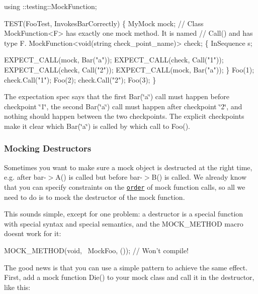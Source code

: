 \begin{DoxyCode}
using ::testing::MockFunction;

TEST(FooTest, InvokesBarCorrectly) \{
  MyMock mock;
  \textcolor{comment}{// Class MockFunction<F> has exactly one mock method.  It is named}
  \textcolor{comment}{// Call() and has type F.}
  MockFunction<void(string check\_point\_name)> check;
  \{
    InSequence s;

    EXPECT\_CALL(mock, Bar(\textcolor{stringliteral}{"a"}));
    EXPECT\_CALL(check, Call(\textcolor{stringliteral}{"1"}));
    EXPECT\_CALL(check, Call(\textcolor{stringliteral}{"2"}));
    EXPECT\_CALL(mock, Bar(\textcolor{stringliteral}{"a"}));
  \}
  Foo(1);
  check.Call(\textcolor{stringliteral}{"1"});
  Foo(2);
  check.Call(\textcolor{stringliteral}{"2"});
  Foo(3);
\}
\end{DoxyCode}


The expectation spec says that the first {\ttfamily Bar(\char`\"{}a\char`\"{})} call must happen before checkpoint \char`\"{}1\char`\"{}, the second {\ttfamily Bar(\char`\"{}a\char`\"{})} call must happen after checkpoint \char`\"{}2\char`\"{}, and nothing should happen between the two checkpoints. The explicit checkpoints make it clear which {\ttfamily Bar(\char`\"{}a\char`\"{})} is called by which call to {\ttfamily Foo()}.

\subsubsection*{Mocking Destructors}

Sometimes you want to make sure a mock object is destructed at the right time, e.\+g. after {\ttfamily bar-\/$>$A()} is called but before {\ttfamily bar-\/$>$B()} is called. We already know that you can specify constraints on the \href{#OrderedCalls}{\tt order} of mock function calls, so all we need to do is to mock the destructor of the mock function.

This sounds simple, except for one problem\+: a destructor is a special function with special syntax and special semantics, and the {\ttfamily M\+O\+C\+K\+\_\+\+M\+E\+T\+H\+OD} macro doesn\textquotesingle{}t work for it\+:


\begin{DoxyCode}
MOCK\_METHOD(\textcolor{keywordtype}{void}, ~MockFoo, ());  \textcolor{comment}{// Won't compile!}
\end{DoxyCode}


The good news is that you can use a simple pattern to achieve the same effect. First, add a mock function {\ttfamily Die()} to your mock class and call it in the destructor, like this\+:


